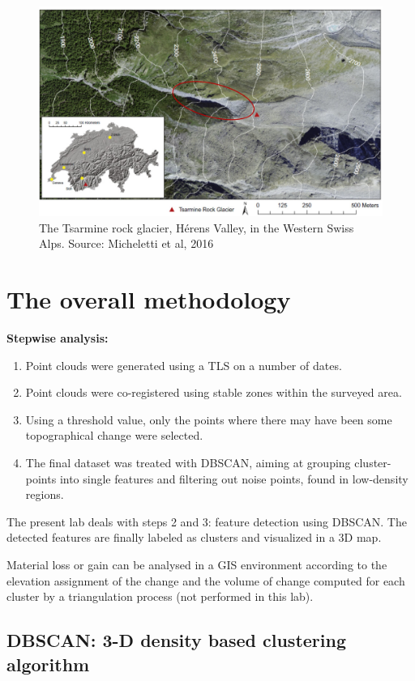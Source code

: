 \documentclass[
]{book}
\providecommand{\tightlist}{%
  \setlength{\itemsep}{0pt}\setlength{\parskip}{0pt}}
\begin{document}
\begin{figure}

{\centering \includegraphics[width=0.5\linewidth,height=0.7\textheight]{images/Tsarmine2} 

}

\caption{The Tsarmine rock glacier, Hérens Valley, in the Western Swiss Alps. Source: Micheletti et al, 2016 \label{Tsarmine}}\label{fig:jpg}
\end{figure}

\hypertarget{the-overall-methodology-1}{%
\section{The overall methodology}\label{the-overall-methodology-1}}

\textbf{Stepwise analysis:}

\begin{enumerate}
\def\labelenumi{\arabic{enumi}.}
\tightlist
\item
  Point clouds were generated using a TLS on a number of dates.
\item
  Point clouds were co-registered using stable zones within the surveyed area.
\item
  Using a threshold value, only the points where there may have been some topographical change were selected.
\item
  The final dataset was treated with DBSCAN, aiming at grouping cluster-points into single features and filtering out noise points, found in low-density regions.
\end{enumerate}

The present lab deals with steps 2 and 3: feature detection using DBSCAN.
The detected features are finally labeled as clusters and visualized in a 3D map.

Material loss or gain can be analysed in a GIS environment according to the elevation assignment of the change and the volume of change computed for each cluster by a triangulation process (not performed in this lab).

\hypertarget{dbscan-3-d-density-based-clustering-algorithm}{%
\subsection{DBSCAN: 3-D density based clustering algorithm}\label{dbscan-3-d-density-based-clustering-algorithm}}
\end{document}
